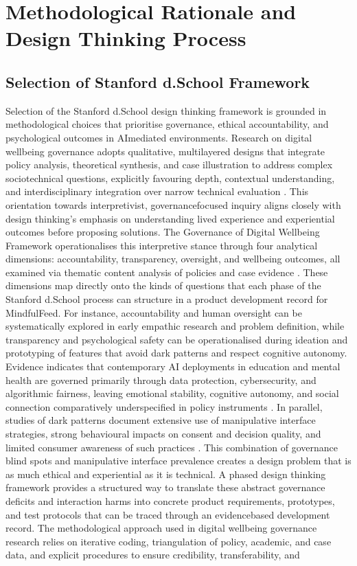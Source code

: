 \documentclass{article}
\begin{document}
\section{Methodological Rationale and Design Thinking Process}

\subsection{Selection of Stanford d.School Framework}
\label{sec:selection_ds_framework} Selection of the Stanford d.School design thinking framework is grounded in methodological choices that prioritise governance, ethical accountability, and psychological outcomes in AI\-mediated environments. Research on digital well\-being governance adopts qualitative, multi\-layered designs that integrate policy analysis, theoretical synthesis, and case illustration to address complex socio\-technical questions, explicitly favouring depth, contextual understanding, and interdisciplinary integration over narrow technical evaluation \parencites[3]{7808872}[7]{7808872}. This orientation towards interpretivist, governance\-focused inquiry aligns closely with design thinking's emphasis on understanding lived experience and experiential outcomes before proposing solutions. The Governance of Digital Well\-being Framework operationalises this interpretive stance through four analytical dimensions: accountability, transparency, oversight, and well\-being outcomes, all examined via thematic content analysis of policies and case evidence \parencites[8]{7808872}. These dimensions map directly onto the kinds of questions that each phase of the Stanford d.School process can structure in a product development record for MindfulFeed. For instance, accountability and human oversight can be systematically explored in early empathic research and problem definition, while transparency and psychological safety can be operationalised during ideation and prototyping of features that avoid dark patterns and respect cognitive autonomy. Evidence indicates that contemporary AI deployments in education and mental health are governed primarily through data protection, cybersecurity, and algorithmic fairness, leaving emotional stability, cognitive autonomy, and social connection comparatively under\-specified in policy instruments \parencites[3]{7808872}[4]{7808872}. In parallel, studies of dark patterns document extensive use of manipulative interface strategies, strong behavioural impacts on consent and decision quality, and limited consumer awareness of such practices \parencites[2]{4807303}[2]{5127387}[3]{4692551}. This combination of governance blind spots and manipulative interface prevalence creates a design problem that is as much ethical and experiential as it is technical. A phased design thinking framework provides a structured way to translate these abstract governance deficits and interaction harms into concrete product requirements, prototypes, and test protocols that can be traced through an evidence\-based development record. The methodological approach used in digital well\-being governance research relies on iterative coding, triangulation of policy, academic, and case data, and explicit procedures to ensure credibility, transferability, and 
\end{document}
